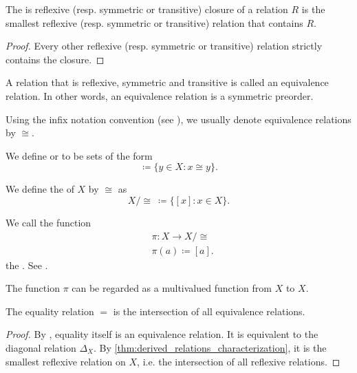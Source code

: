 \begin{proposition}\label{thm:derived_relations_characterization}
  The is reflexive (resp. symmetric or transitive) closure of a relation \( R \) is the smallest reflexive (resp. symmetric or transitive) relation that contains \( R \).
\end{proposition}
\begin{proof}
  Every other reflexive (resp. symmetric or transitive) relation strictly contains the closure.
\end{proof}

\begin{definition}\label{def:equivalence_relation}
  A relation that is reflexive, symmetric and transitive is called an equivalence relation. In other words, an equivalence relation is a symmetric preorder.

  Using the infix notation convention (see ), we usually denote equivalence relations by \( \cong \).

  \begin{defenum}
     We define  or  to be sets of the form
    \begin{equation*}
      [x] \coloneqq \{ y \in X \colon x \cong y \}.
    \end{equation*}

     We define the  of \( X \) by \( \cong \) as
    \begin{equation*}
      X / \cong \ \coloneqq \{ [x] \colon x \in X \}.
    \end{equation*}

     We call the function
    \begin{align*}
      &\pi: X \to X / \cong \\
      &\pi(a) \coloneqq [a].
    \end{align*}
    the . See .

    The function \( \pi \) can be regarded as a multivalued function from \( X \) to \( X \).
  \end{defenum}
\end{definition}

\begin{proposition}\label{thm:equality_is_smallest_equivalence_relation}
  The equality relation \( = \) is the intersection of all equivalence relations.
\end{proposition}
\begin{proof}
  By , equality itself is an equivalence relation. It is equivalent to the diagonal relation \( \Delta_X \). By \cref{thm:derived_relations_characterization}, it is the smallest reflexive relation on \( X \), i.e. the intersection of all reflexive relations.
\end{proof}

